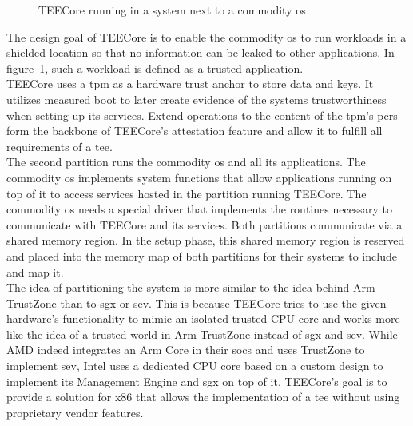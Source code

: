 \label{sec:30:system_overview}
\begin{figure}
  \begin{center}
    
    \caption{TEECore running in a system next to a commodity \gls{os}}
    \label{fig:30:tee_system_design}
  \end{center}
\end{figure}

The design goal of TEECore is to enable the commodity \gls{os} to run workloads
in a shielded location so that no information can be leaked to other
applications. In figure~\ref{fig:30:tee_system_design}, such a workload is
defined as a trusted application.\\

TEECore uses a \gls{tpm} as a hardware trust anchor to store data and keys. It
utilizes measured boot to later create evidence of the systems trustworthiness
when setting up its services. Extend operations to the content of the
\gls{tpm}'s \glspl{pcr} form the backbone of TEECore's attestation feature and
allow it to fulfill all requirements of a \gls{tee}.\\

The second partition runs the commodity \gls{os} and all its applications. The
commodity \gls{os} implements system functions that allow applications running
on top of it to access services hosted in the partition running TEECore. The
commodity \gls{os} needs a special driver that implements the routines necessary
to communicate with TEECore and its services. Both partitions communicate via a
shared memory region. In the setup phase, this shared memory region is reserved
and placed into the memory map of both partitions for their systems to include
and map it.\\

The idea of partitioning the system is more similar to the idea behind Arm
TrustZone than to \gls{sgx} or \gls{sev}. This is because TEECore
tries to use the given hardware's functionality to mimic an isolated trusted CPU
core and works more like the idea of a trusted world in Arm TrustZone instead of
\gls{sgx} and \gls{sev}. While AMD indeed integrates an Arm Core in their
\glspl{soc} and uses TrustZone to implement \gls{sev}, Intel uses a dedicated
CPU core based on a custom design to implement its Management Engine and
\gls{sgx} on top of it. TEECore's goal is to provide a solution for
x86 that allows the implementation of a \gls{tee} without using proprietary
vendor features.

